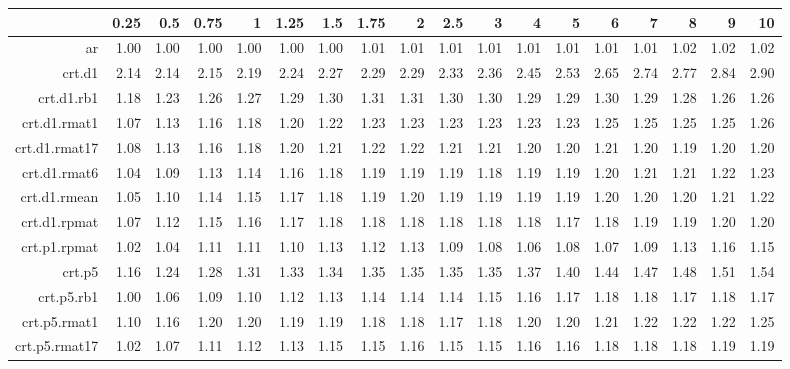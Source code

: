 \begin{tabular}{rrrrrrrrrrrrrrrrrr}
  \hline
 & 0.25 & 0.5 & 0.75 & 1 & 1.25 & 1.5 & 1.75 & 2 & 2.5 & 3 & 4 & 5 & 6 & 7 & 8 & 9 & 10 \\ 
  \hline
ar & 1.00 & 1.00 & 1.00 & 1.00 & 1.00 & 1.00 & 1.01 & 1.01 & 1.01 & 1.01 & 1.01 & 1.01 & 1.01 & 1.01 & 1.02 & 1.02 & 1.02 \\ 
  crt.d1 & 2.14 & 2.14 & 2.15 & 2.19 & 2.24 & 2.27 & 2.29 & 2.29 & 2.33 & 2.36 & 2.45 & 2.53 & 2.65 & 2.74 & 2.77 & 2.84 & 2.90 \\ 
  crt.d1.rb1 & 1.18 & 1.23 & 1.26 & 1.27 & 1.29 & 1.30 & 1.31 & 1.31 & 1.30 & 1.30 & 1.29 & 1.29 & 1.30 & 1.29 & 1.28 & 1.26 & 1.26 \\ 
  crt.d1.rmat1 & 1.07 & 1.13 & 1.16 & 1.18 & 1.20 & 1.22 & 1.23 & 1.23 & 1.23 & 1.23 & 1.23 & 1.23 & 1.25 & 1.25 & 1.25 & 1.25 & 1.26 \\ 
  crt.d1.rmat17 & 1.08 & 1.13 & 1.16 & 1.18 & 1.20 & 1.21 & 1.22 & 1.22 & 1.21 & 1.21 & 1.20 & 1.20 & 1.21 & 1.20 & 1.19 & 1.20 & 1.20 \\ 
  crt.d1.rmat6 & 1.04 & 1.09 & 1.13 & 1.14 & 1.16 & 1.18 & 1.19 & 1.19 & 1.19 & 1.18 & 1.19 & 1.19 & 1.20 & 1.21 & 1.21 & 1.22 & 1.23 \\ 
  crt.d1.rmean & 1.05 & 1.10 & 1.14 & 1.15 & 1.17 & 1.18 & 1.19 & 1.20 & 1.19 & 1.19 & 1.19 & 1.19 & 1.20 & 1.20 & 1.20 & 1.21 & 1.22 \\ 
  crt.d1.rpmat & 1.07 & 1.12 & 1.15 & 1.16 & 1.17 & 1.18 & 1.18 & 1.18 & 1.18 & 1.18 & 1.18 & 1.17 & 1.18 & 1.19 & 1.19 & 1.20 & 1.20 \\ 
  crt.p1.rpmat & 1.02 & 1.04 & 1.11 & 1.11 & 1.10 & 1.13 & 1.12 & 1.13 & 1.09 & 1.08 & 1.06 & 1.08 & 1.07 & 1.09 & 1.13 & 1.16 & 1.15 \\ 
  crt.p5 & 1.16 & 1.24 & 1.28 & 1.31 & 1.33 & 1.34 & 1.35 & 1.35 & 1.35 & 1.35 & 1.37 & 1.40 & 1.44 & 1.47 & 1.48 & 1.51 & 1.54 \\ 
  crt.p5.rb1 & 1.00 & 1.06 & 1.09 & 1.10 & 1.12 & 1.13 & 1.14 & 1.14 & 1.14 & 1.15 & 1.16 & 1.17 & 1.18 & 1.18 & 1.17 & 1.18 & 1.17 \\ 
  crt.p5.rmat1 & 1.10 & 1.16 & 1.20 & 1.20 & 1.19 & 1.19 & 1.18 & 1.18 & 1.17 & 1.18 & 1.20 & 1.20 & 1.21 & 1.22 & 1.22 & 1.22 & 1.25 \\ 
  crt.p5.rmat17 & 1.02 & 1.07 & 1.11 & 1.12 & 1.13 & 1.15 & 1.15 & 1.16 & 1.15 & 1.15 & 1.16 & 1.16 & 1.18 & 1.18 & 1.18 & 1.19 & 1.19 \\ 

\end{tabular}
